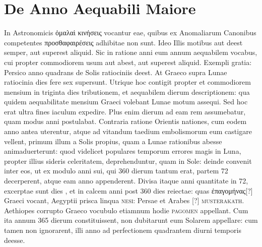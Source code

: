 

\chapter{De Anno Aequabili Maiore}
%
In Astronomicis \textgreek{ὁμαλαὶ κινήσεις} vocantur
eae, quibus ex Anomaliarum Canonibus
competentes \textgreek{προσθαφαιρέσεις} adhibitae non
sunt.
Ideo Illis motibus aut deest semper,
aut superest aliquid.
Sic in ratione anni
eum annum aequabilem vocabus, cui propter
commodiorem usum aut abest, aut superest aliquid.
Exempli gratia: Persico anno
quadrans de Solis ratiociniis deest.
At
Graeco supra Lunae ratiocinia dies fere sex supersunt.
Utrique hoc contigit
propter et commodiorem mensium in triginta dies tributionem,
et aequabilem dierum descriptionem: qua quidem aequabilitate mensium
Graeci volebant Lunae motum assequi. %
Sed hoc erat ultra fines
iaculum expedire.
Plus enim dierum ad eam rem assumebatur, quam
modus anni postulabat.
Contraria ratione Orientis nationes, cum
eodem anno antea uterentur, atque ad vitandum taedium embolismorum
eum castigare vellent, primum illum a Solis propius, quam
a Lunae rationibus abesse animaduerterunt: quod videlicet populares
temporum errores magis in Luna, propter illius sideris celeritatem,
deprehenduntur, quam in Sole: deinde convenit inter
eos, ut ex modulo anni sui, qui 360 dierum tantum erat,
partem 72 decerperent, atque eam anno appenderent.
Divisa itaque
anni quantitate in 72, excerptae sunt dies , et in calcem anni
post 360 dies reiectae: quas \textgreek{ἐπαγομήνας}[?] Graeci vocant, Aegyptii
prisca linqua \textsc{nesi}: Persae et Arabes \textarabic{}[?]
 \textsc{musterakath}.
Aethiopes corrupto Graeco vocubulo etiamnum hodie \textsc{pagomen}
appellant.
Cum ita annum 365 dierum constituissent, non dubitarunt
eum Solarem appellare: cum tamen non ignorarent, illi anno ad
perfectionem quadrantem diurni temporis deesse.
